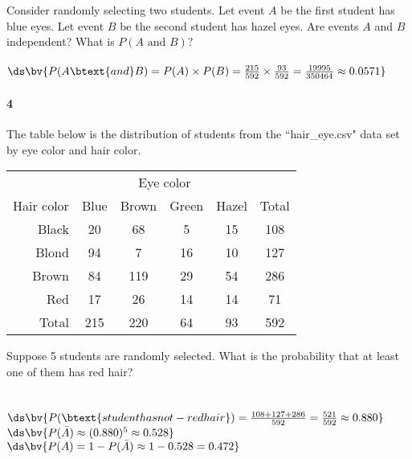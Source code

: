 \documentclass{article}
\begin{document}
\begin{flushleft}
\begin{enumalpha}
\item Consider randomly selecting two students. Let event $A$ be the first student has blue eyes. Let event $B$ be the second student has hazel eyes. Are events $A$ and $B$ independent? What is $P(A \text { and } B)$?\\
\medskip
{}\\
\bigskip
$\ds \bv{P(A \btext{ and } B) = P(A) \times P(B) = \frac {215}{592} \times \frac {93}{592} = \frac {19995}{350464} \approx 0.0571}$

\end{enumalpha}

\newpage
\paragraph{4} The table below is the distribution of students from the ``hair\_eye.csv" data set by eye color and hair color.\\
\medskip
\renewcommand{\arraystretch}{1}
{\centering
\begin{tabular}{ r| c c c c | c}
& \multicolumn{4}{c}{Eye color}\\
Hair color & Blue & Brown & Green & Hazel & Total\\
\hline
  Black &  20  &  68  &   5  &  15 & 108\\
 Blond  & 94   &  7  &  16  &  10 & 127\\
 Brown &  84  & 119  &  29  &  54 & 286\\
 Red   &  17  &  26  &  14  &  14 & 71\\
 \hline
Total	& 215 & 220 & 64 & 93 & 592 
\end{tabular}
\par}

\begin{enumalpha}
\item Suppose 5 students are randomly selected. What is the probability that at least one of them has red hair?\\
\medskip
{}\\
\\
\medskip$\ds \bv{P(\btext{student has not-red hair}) = \frac {108 + 127 + 286}{592} = \frac {521}{592} \approx 0.880}$\\
\medskip$\ds \bv{P(\bar A) \approx (0.880)^5 \approx 0.528}$\\
\medskip$\ds \bv{P(A) = 1-P(\bar A) \approx 1 - 0.528 = 0.472}$
\vspace{.5in}


\end{enumalpha}
\end{flushleft}
\end{document}
